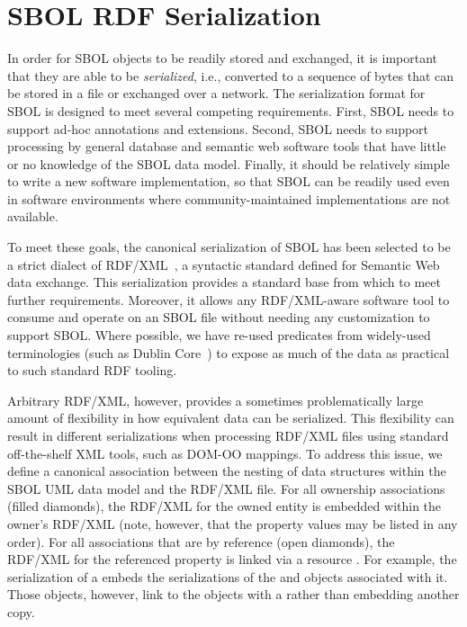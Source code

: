 \section{SBOL RDF Serialization}
\label{sec:serialization}

In order for SBOL objects to be readily stored and exchanged, it is important that they are able to be {\em serialized}, i.e., converted to a sequence of bytes that can be stored in a file or exchanged over a network.  The serialization format for SBOL is designed to meet several competing requirements. 
First, SBOL needs to support ad-hoc annotations and extensions. 
Second, SBOL needs to support processing by general database and semantic web software tools that have little or no knowledge of the SBOL data model. 
Finally, it should be relatively simple to write a new software implementation, so that SBOL can be readily used even in software environments where community-maintained implementations are not available.

To meet these goals, the canonical serialization of SBOL has been selected to be a strict dialect of RDF/XML~\cite{rdfxml}, a syntactic standard defined for Semantic Web data exchange. 
This serialization provides a standard base from which to meet further requirements. 
Moreover, it allows any RDF/XML-aware software tool to consume and operate on an SBOL file without needing any customization to support SBOL. Where possible, we have re-used predicates from widely-used terminologies (such as Dublin Core~\cite{dcmi2012}) to expose as much of the data as practical to such standard RDF tooling.

Arbitrary RDF/XML, however, provides a sometimes problematically large amount of flexibility in how equivalent data can be serialized. This flexibility can result in different serializations when processing RDF/XML files using standard off-the-shelf XML tools, such as DOM-OO mappings. 
To address this issue, we define a canonical association between the nesting of data structures within the SBOL UML data model and the RDF/XML file. For all ownership associations (filled diamonds), the RDF/XML for the owned entity is embedded within the owner's RDF/XML (note, however, that the property values may be listed in any order).
For all associations that are by reference (open diamonds), the RDF/XML for the referenced property is linked via a resource .
For example, the serialization of a  embeds the serializations of the  and  objects associated with it. Those  objects, however, link to the  objects with a  rather than embedding another copy.

